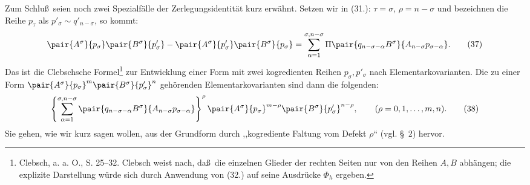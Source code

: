 Zum Schlu\ss\ seien noch zwei Spezialf\"alle der Zerlegungsidentit\"at kurz erw\"ahnt. Setzen wir in (31.): $\tau=\sigma$, $\rho=n-\sigma$ und bezeichnen die Reihe $p_\tau$ als $p'_\sigma\sim q'_{n-\sigma}$, so kommt:
\begin{equation}
\begin{aligned}
\pair{A^\sigma}{p_\sigma}\pair{B^\sigma}{p'_\sigma}
-\pair{A^\sigma}{p'_\sigma}\pair{B^\sigma}{p_\sigma}
=\sum_{\alpha=1}^{\sigma,n-\sigma}
\Pi\pair{q_{n-\sigma-\alpha}B^\sigma}{A_{n-\sigma}p_{\sigma-\alpha}}.
\end{aligned}
\tag{37}
\end{equation}
Das ist die Clebschsche Formel\footnote{Clebsch, a. a. O., S. 25--32. Clebsch weist nach, da\ss\ die einzelnen Glieder der rechten Seiten nur von den Reihen $A,B$ abh\"angen; die explizite Darstellung w\"urde sich durch Anwendung von (32.) auf seine Ausdr\"ucke $\Phi_h$ ergeben.} zur Entwicklung einer Form mit zwei kogredienten Reihen $p_\sigma,p'_\sigma$ nach Elementarkovarianten. Die zu einer Form $\pair{A^\sigma}{p_\sigma}^m\pair{B^\sigma}{p'_\sigma}^n$ geh\"orenden Elementarkovarianten sind dann die folgenden:
\begin{equation}
 \left\{\sum_{\alpha=1}^{\sigma,n-\sigma}
 \pair{q_{n-\sigma-\alpha}B^\sigma}{A_{n-\sigma}p_{\sigma-\alpha}}
 \right\}^{\rho}
 \pair{A^\sigma}{p_\sigma}^{m-\rho}\pair{B^\sigma}{p'_\sigma}^{n-\rho},
 \qquad (\rho=0,1,\ldots,m,n).
\tag{38}
\end{equation}
Sie gehen, wie wir kurz sagen wollen, aus der Grundform durch ,,kogrediente Faltung vom Defekt $\rho$`` (vgl. \S\ 2) hervor.
